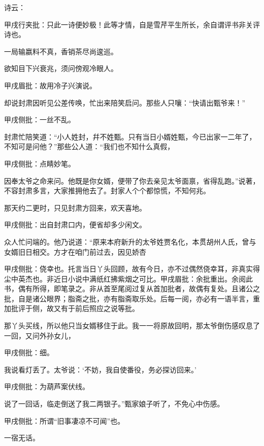 \begin{parag}
    诗云：\begin{note}甲戌行夹批：只此一诗便妙极！此等才情，自是雪芹平生所长，余自谓评书非关评诗也。\end{note}
\end{parag}


\begin{poem}

    \begin{pl}
        一局输嬴料不真，香销茶尽尚逡巡。\end{pl}

    \begin{pl}
        欲知目下兴衰兆，须问傍观冷眼人。\end{pl}\begin{note}甲戌眉批：故用冷子兴演说。\end{note}
\end{poem}
\begin{parag}
    却说封肃因听见公差传唤，忙出来陪笑启问。那些人只嚷：“快请出甄爷来！”\begin{note}甲戌侧批：一丝不乱。\end{note}封肃忙陪笑道：“小人姓封，幷不姓甄。只有当日小婿姓甄，今已出家一二年了，不知可是问他？”那些公人道：“我们也不知什么真假，\begin{note}甲戌侧批：点睛妙笔。\end{note}因奉太爷之命来问。他既是你女婿，便带了你去亲见太爷面禀，省得乱跑。”说著，不容封肃多言，大家推拥他去了。封家人个个都惊慌，不知何兆。
\end{parag}


\begin{parag}
    那天约二更时，只见封肃方回来，欢天喜地。\begin{note}甲戌侧批：出自封肃口内，便省却多少闲文。\end{note}众人忙问端的。他乃说道：“原来本府新升的太爷姓贾名化，本贯胡州人氏，曾与女婿旧日相交。方才在咱门前过去，因见娇杏\begin{note}甲戌侧批：侥幸也。托言当日丫头回顾，故有今日，亦不过偶然侥幸耳，非真实得尘中英杰也。非近日小说中满纸红拂紫烟之可比。甲戌眉批：余批重出。余阅此书，偶有所得，即笔录之。非从首至尾阅过复从首加批者，故偶有复处。且诸公之批，自是诸公眼界；脂斋之批，亦有脂斋取乐处。后每一阅，亦必有一语半言，重加批评于侧，故又有于前后照应之说等批。\end{note}那丫头买线，所以他只当女婿移住于此。我一一将原故回明，那太爷倒伤感叹息了一回，又问外孙女儿，\begin{note}甲戌侧批：细。\end{note}我说看灯丢了。太爷说：‘不妨，我自使番役，务必探访回来。’\begin{note}甲戌侧批：为葫芦案伏线。\end{note}说了一回话，临走倒送了我二两银子。”甄家娘子听了，不免心中伤感。\begin{note}甲戌侧批：所谓“旧事凄凉不可闻”也。\end{note}一宿无话。
\end{parag}


